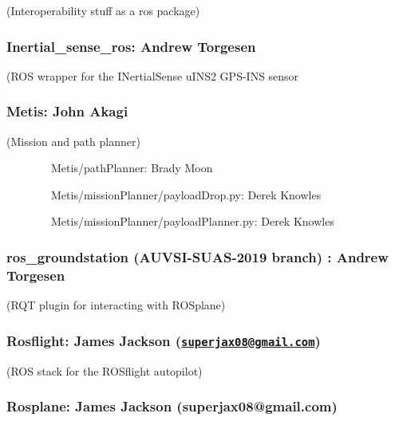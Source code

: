 {(Interoperability stuff as a ros package)}

\hypertarget{h.3xc7veylyan1}{\subsubsection{\texorpdfstring{{Inertial\_sense\_ros:
Andrew
Torgesen}}{Inertial\_sense\_ros: Andrew Torgesen}}\label{h.3xc7veylyan1}}

{(ROS wrapper for the INertialSense uINS2 GPS-INS sensor}

\hypertarget{h.md8utgthwf1}{\subsubsection{\texorpdfstring{{Metis: John
Akagi}}{Metis: John Akagi}}\label{h.md8utgthwf1}}

{(Mission and path planner)}

{~~~~~~~~Metis/pathPlanner: Brady Moon}

{~~~~~~~~Metis/missionPlanner/payloadDrop.py: Derek Knowles}

{~~~~~~~~Metis/missionPlanner/payloadPlanner.py: Derek Knowles}

\hypertarget{h.oze4xaqxxlu9}{\subsubsection{\texorpdfstring{{ros\_groundstation
(AUVSI-SUAS-2019 branch) : Andrew
Torgesen}}{ros\_groundstation (AUVSI-SUAS-2019 branch) : Andrew Torgesen}}\label{h.oze4xaqxxlu9}}

{(RQT plugin for interacting with ROSplane)}

\hypertarget{h.phcluy8fl6f3}{\subsubsection{\texorpdfstring{{Rosflight:
James Jackson
(}{\href{mailto:superjax08@gmail.com}{\nolinkurl{superjax08@gmail.com}}}{)}}{Rosflight: James Jackson (superjax08@gmail.com)}}\label{h.phcluy8fl6f3}}

{(ROS stack for the ROSflight autopilot)}

{}

\hypertarget{h.rfp5kydue3f1}{\subsubsection{\texorpdfstring{{Rosplane:
James Jackson
(}{superjax08@gmail.com}{)}}{Rosplane: James Jackson (superjax08@gmail.com)}}\label{h.rfp5kydue3f1}}

